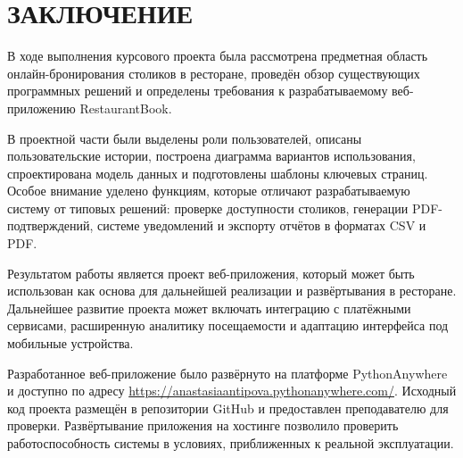 \section*{ЗАКЛЮЧЕНИЕ}

В ходе выполнения курсового проекта была рассмотрена предметная область
онлайн-бронирования столиков в ресторане, проведён обзор существующих
программных решений и определены требования к разрабатываемому
веб-приложению RestaurantBook.

В проектной части были выделены роли пользователей, описаны
пользовательские истории, построена диаграмма вариантов использования,
спроектирована модель данных и подготовлены шаблоны ключевых страниц.
Особое внимание уделено функциям, которые отличают разрабатываемую
систему от типовых решений: проверке доступности столиков, генерации
PDF-подтверждений, системе уведомлений и экспорту отчётов в форматах
CSV и PDF.

Результатом работы является проект веб-приложения, который может быть
использован как основа для дальнейшей реализации и развёртывания в
ресторане. Дальнейшее развитие проекта может включать интеграцию с
платёжными сервисами, расширенную аналитику посещаемости и адаптацию
интерфейса под мобильные устройства.


Разработанное веб-приложение было развёрнуто на платформе PythonAnywhere и доступно по адресу \url{https://anastasiaantipova.pythonanywhere.com/}. Исходный код проекта размещён в репозитории GitHub и предоставлен преподавателю для проверки. Развёртывание приложения на хостинге позволило проверить работоспособность системы в условиях, приближенных к реальной эксплуатации.
